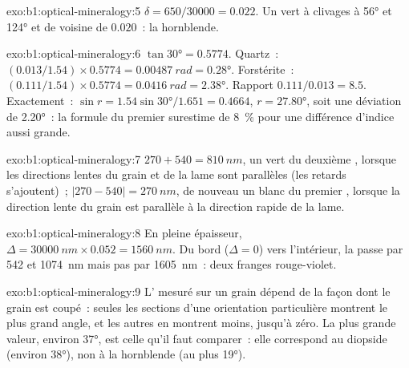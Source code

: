 \begin{solution}{exo:b1:optical-mineralogy:5}
$\delta = 650/30000 = 0.022$. Un  vert  à clivages à
\ang{56} et \ang{124} et de  voisine de $0.020$~: la hornblende.
\end{solution}

\begin{solution}{exo:b1:optical-mineralogy:6}
$\tan\ang{30} = 0.5774$. Quartz~: $(0.013/1.54)\times0.5774 = \qty{0.00487}{rad}
= \ang{0.28}$. Forstérite~: $(0.111/1.54)\times0.5774 = \qty{0.0416}{rad} =
\ang{2.38}$. Rapport $0.111/0.013 = 8.5$. Exactement~: $\sin r = 1.54\sin\ang{30}/1.651
= 0.4664$, $r = \ang{27.80}$, soit une déviation de \ang{2.20}~: la formule du
premier  surestime de \qty{8}{\percent} pour une différence d'indice aussi
grande.
\end{solution}

\begin{solution}{exo:b1:optical-mineralogy:7}
$270 + 540 = \qty{810}{nm}$, un vert du deuxième , lorsque les directions
lentes du grain et de la lame sont parallèles (les retards s'ajoutent)~; $|270 - 540| =
\qty{270}{nm}$, de nouveau un blanc du premier , lorsque la direction lente
du grain est parallèle à la direction rapide de la lame.
\end{solution}

\begin{solution}{exo:b1:optical-mineralogy:8}
En pleine épaisseur, $\Delta = \qty{30000}{nm}\times0.052 = \qty{1560}{nm}$. Du
bord ($\Delta = 0$) vers l'intérieur, la  passe par 542 et
\qty{1074}{nm} mais pas par \qty{1605}{nm}~: deux franges rouge-violet.
\end{solution}

\begin{solution}{exo:b1:optical-mineralogy:9}
L' mesuré sur un grain dépend de la façon dont le grain est
coupé~: seules les sections d'une orientation particulière montrent le plus grand
angle, et les autres en montrent moins, jusqu'à zéro. La plus grande valeur,
environ \ang{37}, est celle qu'il faut comparer~: elle correspond au diopside
(environ \ang{38}), non à la hornblende (au plus \ang{19}).
\end{solution}

